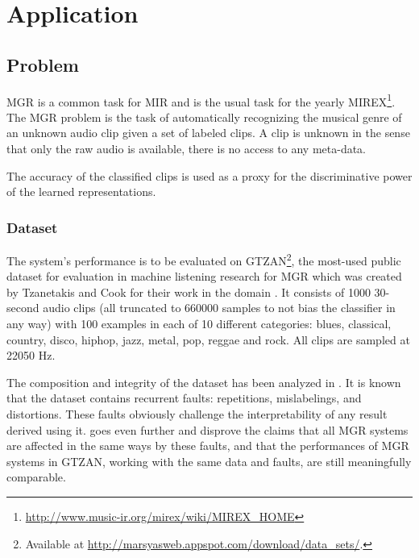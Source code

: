 \part{Application} \label{part:application}

\chapter{Problem} \label{chap:problem}

\gls{MGR} is a common task for \gls{MIR} and is the usual task for the yearly \gls{MIREX}\footnote{\url{http://www.music-ir.org/mirex/wiki/MIREX_HOME}}. The \gls{MGR} problem is the task of automatically recognizing the musical genre of an unknown audio clip given a set of labeled clips. A clip is unknown in the sense that only the raw audio is available, there is no access to any meta-data.

The accuracy of the classified clips is used as a proxy for the discriminative power of the learned representations.

\section{Dataset}

The system's performance is to be evaluated on GTZAN\footnote{Available at \url{http://marsyasweb.appspot.com/download/data\_sets/}.}, the most-used public dataset for evaluation in machine listening research for \gls{MGR} \cite{sturm2014survey} which was created by Tzanetakis and Cook for their work in the domain \cite{tzanetakis2002GTZAN}. It consists of 1000 30-second audio clips (all truncated to $660000$ samples to not bias the classifier in any way) with 100 examples in each of 10 different categories: blues, classical, country, disco, hiphop, jazz, metal, pop, reggae and rock. All clips are sampled at 22050 Hz.

The composition and integrity of the dataset has been analyzed in \cite{sturm2012GTZANanalysis}. It is known that the dataset contains recurrent faults: repetitions, mislabelings, and distortions. These faults obviously challenge the interpretability of any result derived using it. \cite{sturm2013GTZANcritic} goes even further and disprove the claims that all \gls{MGR} systems are affected in the same ways by these faults, and that the performances of \gls{MGR} systems in GTZAN, working with the same data and faults, are still meaningfully comparable.

